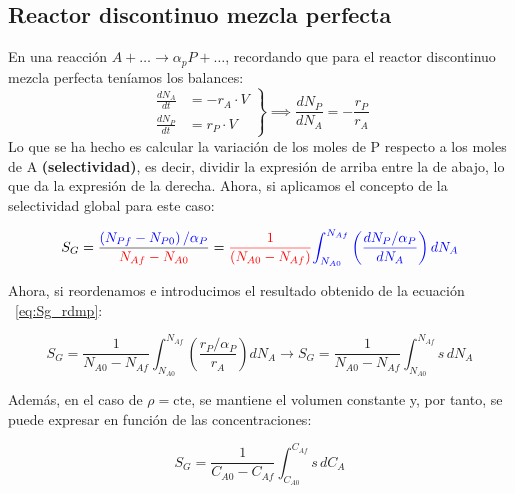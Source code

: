 \subsection{Reactor discontinuo mezcla perfecta}
\noindent En una reacción $A + \dots \to \alpha_p P + \dots$, recordando que para el reactor discontinuo mezcla perfecta teníamos los balances:
\begin{equation}
  \left.
  \begin{aligned}
    \frac{dN_A}{dt} & = -r_A \cdot V \\[10pt]
    \frac{dN_P}{dt} & = r_P \cdot V
  \end{aligned}
  \right\} \implies \frac{dN_P}{dN_A} = -\frac{r_P}{r_A}
  \label{eq:Sg_rdmp}
\end{equation}
Lo que se ha hecho es calcular la variación de los moles de P respecto a los moles de A \textbf{(selectividad)}, es decir, dividir la expresión de arriba entre la de abajo, lo que da la expresión de la derecha.
Ahora, si aplicamos el concepto de la selectividad global para este caso:

\begin{equation}
  S_G = \frac{\textcolor{blue}{\left(N_{Pf}-N_{P0}\right)/\alpha_P}}{\textcolor{red}{N_{Af}-N_{A0}}} = \textcolor{red}{\frac{1}{(N_{A0}-N_{Af})}}\textcolor{blue}{\int_{N_{A0}}^{N_{Af}}\left(\frac{dN_P/\alpha_P}{dN_A}\right)dN_A}
\end{equation}


Ahora, si reordenamos e introducimos el resultado obtenido de la ecuación ~\eqref{eq:Sg_rdmp}:

\begin{equation}
  S_G = \frac{1}{N_{A0}-N_{Af}}\int_{N_{A0}}^{N_{Af}}\left(\frac{r_P/\alpha_P}{r_A}\right)dN_A \rightarrow \boxed{S_G=\frac{1}{N_{A0}-N_{Af}}\int_{N_{A0}}^{N_{Af}}s \, dN_A}
\end{equation}

\noindent Además, en el caso de $\rho = \text{cte}$, se mantiene el volumen constante y, por tanto, se puede expresar en función de las concentraciones:

\begin{equation}
  \boxed{S_G = \frac{1}{C_{A0}-C_{Af}}\int_{C_{A0}}^{C_{Af}}s \, dC_A}
\end{equation}

